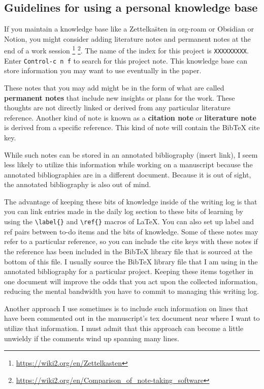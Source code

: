 \documentclass[10pt,letterpaper]{article}
\begin{document}
\subsection{Guidelines for using a personal knowledge base}
\label{subsec:guides:knowledgebase}

If you maintain a knowledge base like a Zettelka\"sten  in org-roam or Obsidian or Notion, you might consider adding literature notes and permanent notes at the end of a work session \footnote{\url{https://wiki2.org/en/Zettelkasten}} \footnote{\url{https://wiki2.org/en/Comparison_of_note-taking_software}}.
The name of the index for this project is \verb|XXXXXXXXX|.
Enter \texttt{Control-c n f} to search for this project note.
This knowledge base can store information you may want to use eventually in the paper.

These notes that you may add might be in the form of what are called \textbf{permanent notes} that include new insights or plans for the work.
These thoughts are not directly linked or derived from any particular literature reference.
Another kind of note is known as a \textbf{citation note} or \textbf{literature note} is derived from a specific reference.
This kind of note will contain the BibTeX cite key.

While such notes can be stored in an annotated bibliography (insert link), I seem less likely to utilize this information while working on a manuscript because the annotated bibliographies are in a different document.
Because it is out of sight, the annotated bibliography is also out of mind.

The advantage of keeping these bits of knowledge inside of the writing log is that you can link entries made in the daily log section to these bits of learning by using the \verb|\label{}| and \verb|\ref{}| macros of \LaTeX.
You can also set up label and ref pairs between to-do items and the bits of knowledge.
Some of these notes may refer to a particular reference, so you can include the cite keys with these notes if the reference has been included in the BibTeX library file that is sourced at the bottom of this file.
I usually source the BibTeX library file that I am using in the annotated bibliography for a particular project.
Keeping these items together in one document will improve the odds that you act upon the collected information, reducing the mental bandwidth you have to commit to managing this writing log.

Another approach I use sometimes is to include such information on lines that have been commented out in the manuscript's tex document near where I want to utilize that information.
I must admit that this approach can become a little unwieldy if the comments wind up spanning many lines.
\end{document}
